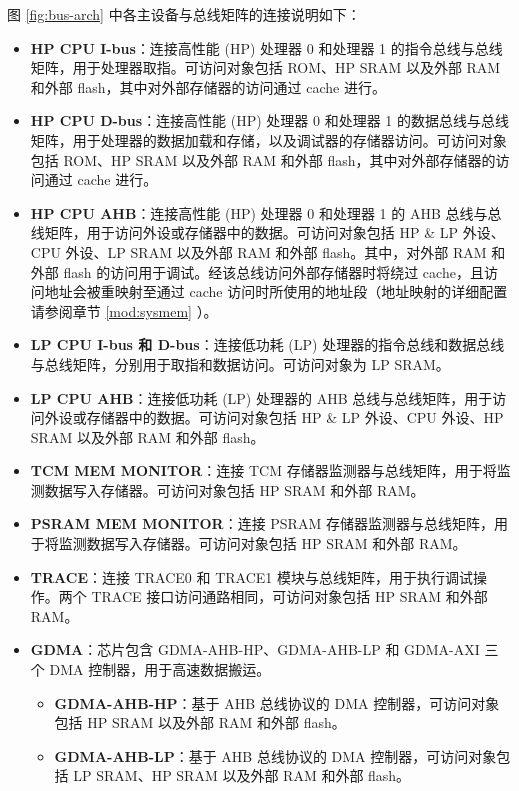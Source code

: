 \documentclass[main\_\_CN.tex]{subfiles}
\begin{document}
图 \ref{fig:bus-arch} \textit{} 中各主设备与总线矩阵的连接说明如下：


\begin{itemize}
    \item \textbf{HP CPU I-bus}：连接高性能 (HP) 处理器 0 和处理器 1 的指令总线与总线矩阵，用于处理器取指。可访问对象包括 ROM、HP SRAM 以及外部 RAM 和外部 flash，其中对外部存储器的访问通过 cache 进行。
    \item \textbf{HP CPU D-bus}：连接高性能 (HP) 处理器 0 和处理器 1 的数据总线与总线矩阵，用于处理器的数据加载和存储，以及调试器的存储器访问。可访问对象包括 ROM、HP SRAM 以及外部 RAM 和外部 flash，其中对外部存储器的访问通过 cache 进行。
    \item \textbf{HP CPU AHB}：连接高性能 (HP) 处理器 0 和处理器 1 的 AHB 总线与总线矩阵，用于访问外设或存储器中的数据。可访问对象包括 HP \& LP 外设、CPU 外设、LP SRAM 以及外部 RAM 和外部 flash。其中，对外部 RAM 和外部 flash 的访问用于调试。经该总线访问外部存储器时将绕过 cache，且访问地址会被重映射至通过 cache 访问时所使用的地址段（地址映射的详细配置请参阅章节 \ref{mod:sysmem} \textit{}）。
    \item \textbf{LP CPU I-bus 和 D-bus}：连接低功耗 (LP) 处理器的指令总线和数据总线与总线矩阵，分别用于取指和数据访问。可访问对象为 LP SRAM。
    \item \textbf{LP CPU AHB}：连接低功耗 (LP) 处理器的 AHB 总线与总线矩阵，用于访问外设或存储器中的数据。可访问对象包括 HP \& LP 外设、CPU 外设、HP SRAM 以及外部 RAM 和外部 flash。
    \item \textbf{TCM MEM MONITOR}：连接 TCM 存储器监测器与总线矩阵，用于将监测数据写入存储器。可访问对象包括 HP SRAM 和外部 RAM。
    \item \textbf{PSRAM MEM MONITOR}：连接 PSRAM 存储器监测器与总线矩阵，用于将监测数据写入存储器。可访问对象包括 HP SRAM 和外部 RAM。
    \item \textbf{TRACE}：连接 TRACE0 和 TRACE1 模块与总线矩阵，用于执行调试操作。两个 TRACE 接口访问通路相同，可访问对象包括 HP SRAM 和外部 RAM。
    \item \textbf{GDMA}：芯片包含 GDMA-AHB-HP、GDMA-AHB-LP 和 GDMA-AXI 三个 DMA 控制器，用于高速数据搬运。
        \begin{itemize}
            \item \textbf{GDMA-AHB-HP}：基于 AHB 总线协议的 DMA 控制器，可访问对象包括 HP SRAM 以及外部 RAM 和外部 flash。
            \item \textbf{GDMA-AHB-LP}：基于 AHB 总线协议的 DMA 控制器，可访问对象包括 LP SRAM、HP SRAM 以及外部 RAM 和外部 flash。

\end{itemize}
\end{itemize}
\end{document}
